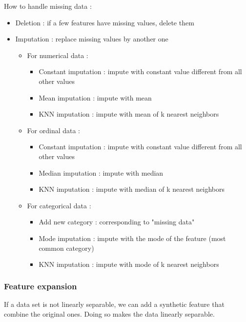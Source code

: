 \documentclass[../main.tex]{subfiles}
\begin{document}
How to handle missing data : \begin{itemize}
    \item Deletion : if a few features have missing values, delete them\\
    \item Imputation : replace missing values by another one \begin{itemize}
        \item For numerical data : \begin{itemize}
            \item Constant imputation : impute with constant value different from all other values\\
            \item Mean imputation : impute with mean\\
            \item KNN imputation : impute with mean of k nearest neighbors\\
        \end{itemize}
        \item For ordinal data : \begin{itemize}
            \item Constant imputation : impute with constant value different from all other values\\
            \item Median imputation : impute with median\\
            \item KNN imputation : impute with median of k nearest neighbors\\
        \end{itemize}
        \item For categorical data : \begin{itemize}
            \item Add new category : corresponding to "missing data"\\
            \item Mode imputation : impute with the mode of the feature (most common category)\\
            \item KNN imputation : impute with mode of k nearest neighbors\\
        \end{itemize}
    \end{itemize}
\end{itemize}

\subsubsection{Feature expansion}
If a data set is not linearly separable, we can add a synthetic feature that combine the original ones. Doing so makes the data linearly separable.\\
\end{document}
